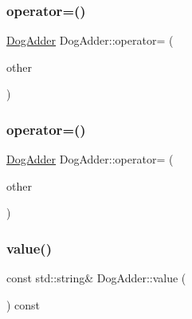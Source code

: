 \mbox{\label{class_dog_adder_a13bd773069c15b083f876b8afd512247}} 
\subsubsection{\texorpdfstring{operator=()}{operator=()}\hspace{0.1cm}{\footnotesize\ttfamily [2/3]}}
{\footnotesize\ttfamily \mbox{\hyperlink{class_dog_adder}{Dog\+Adder}} Dog\+Adder\+::operator= (\begin{DoxyParamCaption}\item[{const \mbox{\hyperlink{class_dog_adder}{Dog\+Adder}} \&}]{other }\end{DoxyParamCaption})\hspace{0.3cm}{\ttfamily [inline]}}

\mbox{\label{class_dog_adder_a13bd773069c15b083f876b8afd512247}} 
\subsubsection{\texorpdfstring{operator=()}{operator=()}\hspace{0.1cm}{\footnotesize\ttfamily [3/3]}}
{\footnotesize\ttfamily \mbox{\hyperlink{class_dog_adder}{Dog\+Adder}} Dog\+Adder\+::operator= (\begin{DoxyParamCaption}\item[{const \mbox{\hyperlink{class_dog_adder}{Dog\+Adder}} \&}]{other }\end{DoxyParamCaption})\hspace{0.3cm}{\ttfamily [inline]}}

\mbox{\label{class_dog_adder_a76bb9e42f79e9d4adacd9e48a3a3c9fb}} 
\subsubsection{\texorpdfstring{value()}{value()}\hspace{0.1cm}{\footnotesize\ttfamily [1/3]}}
{\footnotesize\ttfamily const std\+::string\& Dog\+Adder\+::value (\begin{DoxyParamCaption}{ }\end{DoxyParamCaption}) const\hspace{0.3cm}{\ttfamily [inline]}}


